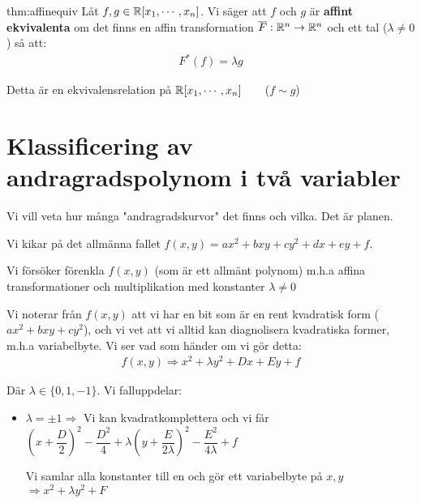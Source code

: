 \par\bigskip
\begin{theo}{thm:affinequiv}
  Låt $f,g\in\mathbb{R}[x_1,\cdots,x_n]$. Vi säger att $f$ och $g$ är \textbf{affint ekvivalenta} om det finns en affin transformation $\overline{F}:\mathbb{R}^n\to\mathbb{R}^n$ och ett tal ($\lambda\neq0$) så att:
  \begin{equation*}
    \begin{gathered}
      F^*(f) = \lambda g
    \end{gathered}
  \end{equation*}
  \par\bigskip
  \noindent Detta är en ekvivalensrelation på $\mathbb{R}[x_1,\cdots,x_n]$$\qquad$($f\sim g$)
\end{theo}
\newpage
\section{Klassificering av andragradspolynom i två variabler}
\par\bigskip
\noindent Vi vill veta hur många "andragradskurvor" det finns och vilka. Det är planen.\par
\noindent Vi kikar på det allmänna fallet $f(x,y)=ax^2+bxy+cy^2+dx+ey+f$.\par
\noindent Vi försöker förenkla $f(x,y)$ (som är ett allmänt polynom) m.h.a affina transformationer och multiplikation med konstanter $\lambda \neq0$
\par\bigskip
\noindent Vi noterar från $f(x,y)$ att vi har en bit som är en rent kvadratisk form ($ax^2+bxy+cy^2$), och vi vet att vi alltid kan diagnolisera kvadratiska former, m.h.a variabelbyte. Vi ser vad som händer om vi gör detta:
\begin{equation*}
  \begin{gathered}
    f(x,y)\Rightarrow x^2+\lambda y^2 + Dx+Ey+f
  \end{gathered}
\end{equation*}\par
\noindent Där $\lambda\in\{0,1,-1\}$. Vi falluppdelar:
\begin{itemize}
  \item $\lambda = \pm 1\Rightarrow$ Vi kan kvadratkomplettera och vi får $\left(x+\dfrac{D}{2}\right)^2-\dfrac{D^2}{4}+\lambda\left(y+\dfrac{E}{2\lambda}\right)^2-\dfrac{E^2}{4\lambda}+f$
    \par\bigskip
    \noindent Vi samlar alla konstanter till en och gör ett variabelbyte på $x,y$ $\Rightarrow x^2+\lambda y^2+F$
\end{itemize}
